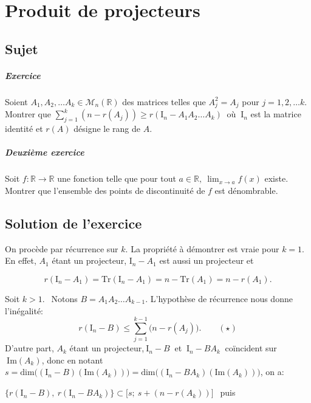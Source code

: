 \chapter{Produit de projecteurs}

\section{Sujet}
\paragraph { Exercice}

Soient $A_1,A_2,\dots A_k \in \mathcal M_n (\mathbb R)$ des matrices telles que $A_j^2 =A_j$ pour $j=1,2,\dots k.$ Montrer que
$\displaystyle \sum_{j=1} ^k (n- r(A_j)) \geqslant r (\mathrm I_n -A_1A_2\dots A_k)\:$ où $\:\mathrm I_n$ est la matrice identité et $r(A)$ désigne le rang de $A.$
\paragraph{Deuxième exercice}

Soit $f : \mathbb R \to \mathbb R$ une fonction telle que pour tout $a \in \mathbb R,\ \lim_{x\to a} f(x)$ existe.
Montrer que l'ensemble des points de discontinuité de $f$ est dénombrable.

\section{Solution de l'exercice} %

On procède par récurrence sur $k.$
La propriété à démontrer est vraie pour $k=1$.
En effet, $A_1$ étant un projecteur, $\mathrm I_n -A_1$ est aussi un projecteur et 

$$r(\mathrm I _n -A_1) = \mathrm{Tr} (\mathrm I_n -A_1) = n -\mathrm{Tr} (A_1) =n -r(A_1).$$

Soit $k>1.\:\:$ Notons $B=A_1A_2 \dots A_{k-1}.$ L'hypothèse de récurrence nous donne l'inégalité:
$$r( \mathrm I_n - B) \leqslant\displaystyle \sum _{j=1}^{k-1} \big(n- r(A_j)\big) . \qquad (\star)$$ 
D'autre part, $A_k$ étant un projecteur,$\:\mathrm I_n -B\:$ et $\:\mathrm I_n- BA_k\:$ coïncident sur $\:\text {Im}(A_k)$, donc en notant $s= \text{dim}\Big( (\mathrm I_n -B) (\text{Im}(A_k))\Big) = \text{dim} \Big (( \mathrm I_n - BA_k) (\text {Im} (A_k)) \Big)$, on a:

$ \Big\{  r(\mathrm I_n -B),\: r(\mathrm I_n - BA_k) \Big \} \subset \Big[s;\: s + (n-r(A_k))\Big] \:\:$ puis

